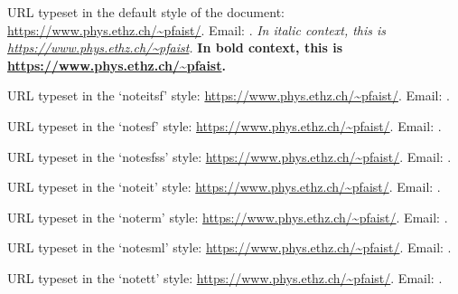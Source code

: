 \documentclass[11pt,a4paper]{article}
\theoremstyle{plain}
\begin{document}
{%

  URL typeset in the default style of the document:
  \url{https://www.phys.ethz.ch/~pfaist/}. Email:
  .
  \textit{In italic context, this is \url{https://www.phys.ethz.ch/~pfaist}.}
  \textbf{In bold context, this is \url{https://www.phys.ethz.ch/~pfaist}.}

    URL typeset in the `noteitsf' style:
  \url{https://www.phys.ethz.ch/~pfaist/}. Email:
  .

    URL typeset in the `notesf' style:
  \url{https://www.phys.ethz.ch/~pfaist/}. Email:
  .

    URL typeset in the `notesfss' style:
  \url{https://www.phys.ethz.ch/~pfaist/}. Email:
  .

    URL typeset in the `noteit' style:
  \url{https://www.phys.ethz.ch/~pfaist/}. Email:
  .

    URL typeset in the `noterm' style:
  \url{https://www.phys.ethz.ch/~pfaist/}. Email:
  .

   URL typeset in the `notesml' style:
  \url{https://www.phys.ethz.ch/~pfaist/}. Email:
  .

    URL typeset in the `notett' style:
  \url{https://www.phys.ethz.ch/~pfaist/}. Email:
  .

}



%
%
%

\end{document}
